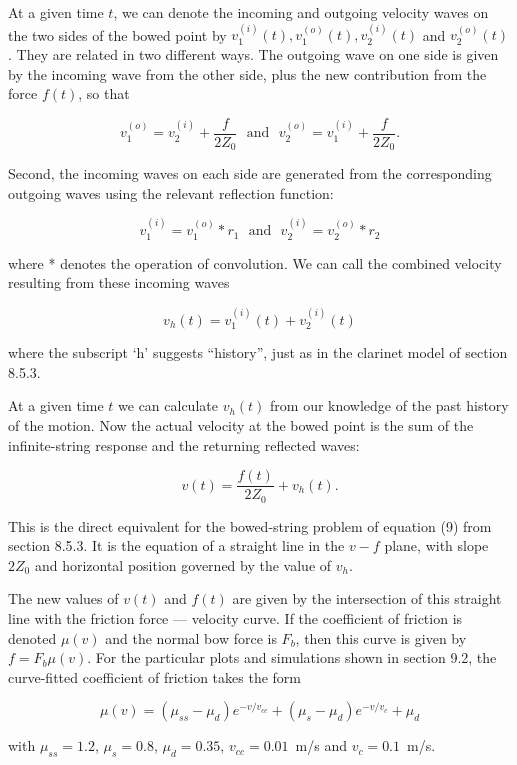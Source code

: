 
  At a given time $t$, we can denote the incoming and outgoing velocity waves 
  on the two sides of the bowed point by $v_1^{(i)}(t), v_1^{(o)}(t), 
  v_2^{(i)}(t)$ and $v_2^{(o)}(t)$. They are related in two different ways. The 
  outgoing wave on one side is given by the incoming wave from the other side, 
  plus the new contribution from the force $f(t)$, so that 

  $$v_1^{(o)} = v_2^{(i)} + \dfrac{f}{2Z_0} \mathrm{~~~ and~~~} v_2^{(o)} = 
  v_1^{(i)} + \dfrac{f}{2Z_0} . \tag{1}$$ 

  Second, the incoming waves on each side are generated from the corresponding 
  outgoing waves using the relevant reflection function: 

  $$v_1^{(i)} = v_1^{(o)} * r_1 \mathrm{~~~ and~~~} v_2^{(i)} = v_2^{(o)} * r_2 
  \tag{2}$$ 

  where * denotes the operation of convolution. We can call the combined 
  velocity resulting from these incoming waves 

  $$v_h(t)=v_1^{(i)}(t) + v_2^{(i)}(t) \tag{3}$$ 

  where the subscript `h' suggests ``history'', just as in the clarinet model 
  of section 8.5.3. 

  At a given time $t$ we can calculate $v_h(t)$ from our knowledge of the past 
  history of the motion. Now the actual velocity at the bowed point is the sum 
  of the infinite-string response and the returning reflected waves: 

  $$v(t)=\frac{f(t)}{2Z_0} +v_h(t) . \tag{4}$$ 

  This is the direct equivalent for the bowed-string problem of equation (9) 
  from section 8.5.3. It is the equation of a straight line in the $v-f$ plane, 
  with slope $2Z_0$ and horizontal position governed by the value of $v_h$. 

  The new values of $v(t)$ and $f(t)$ are given by the intersection of this 
  straight line with the friction force --- velocity curve. If the coefficient 
  of friction is denoted $\mu(v)$ and the normal bow force is $F_b$, then this 
  curve is given by $f=F_b \mu(v)$. For the particular plots and simulations 
  shown in section 9.2, the curve-fitted coefficient of friction takes the form 

  $$\mu(v)=(\mu_{ss}-\mu_d) e^{-v/v_{cc}} + (\mu_s-\mu_d) e^{-v/v_c} + \mu_d 
  \tag{5}$$ 

  with $\mu_{ss}=1.2$, $\mu_s=0.8$, $\mu_d=0.35$, $v_{cc}=0.01$ m/s and 
  $v_c=0.1$ m/s. 
